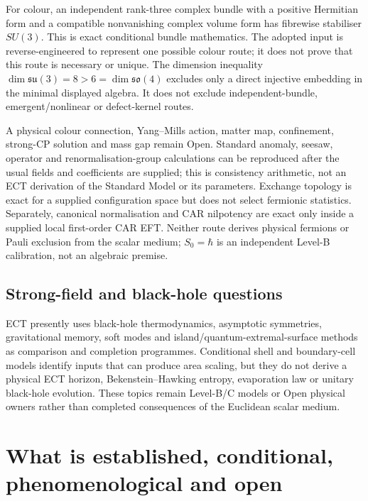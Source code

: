 \documentclass[11pt,a4paper]{article}
\begin{document}
For colour, an independent rank-three complex bundle with a positive
Hermitian form and a compatible nonvanishing complex volume form has
fibrewise stabiliser $SU(3)$.  This is exact conditional bundle mathematics.
The adopted input is reverse-engineered to represent one possible colour
route; it does not prove that this route is necessary or unique.  The
dimension inequality $\dim\mathfrak{su}(3)=8>6=\dim\mathfrak{so}(4)$ excludes
only a direct injective embedding in the minimal displayed algebra.  It does
not exclude independent-bundle, emergent/nonlinear or defect-kernel routes.

A physical colour connection, Yang--Mills action, matter map, confinement,
strong-CP solution and mass gap remain Open.  Standard anomaly, seesaw,
operator and renormalisation-group calculations can be reproduced after the
usual fields and coefficients are supplied; this is consistency arithmetic,
not an ECT derivation of the Standard Model or its parameters.  Exchange
topology is exact for a supplied configuration space but does not select
fermionic statistics.  Separately, canonical normalisation and CAR nilpotency
are exact only inside a supplied local first-order CAR EFT.  Neither route
derives physical fermions or Pauli exclusion from the scalar medium;
$S_0=\hbar$ is an independent Level-B calibration, not an algebraic premise.

\subsection{Strong-field and black-hole questions}

ECT presently uses black-hole thermodynamics, asymptotic symmetries,
gravitational memory, soft modes and island/quantum-extremal-surface methods
as comparison and completion programmes.  Conditional shell and boundary-cell
models identify inputs that can produce area scaling, but they do not derive a
physical ECT horizon, Bekenstein--Hawking entropy, evaporation law or unitary
black-hole evolution.  These topics remain Level-B/C models or Open physical
owners rather than completed consequences of the Euclidean scalar medium.

\section{What is established, conditional, phenomenological and open}
\label{sec:status_map}
\end{document}
